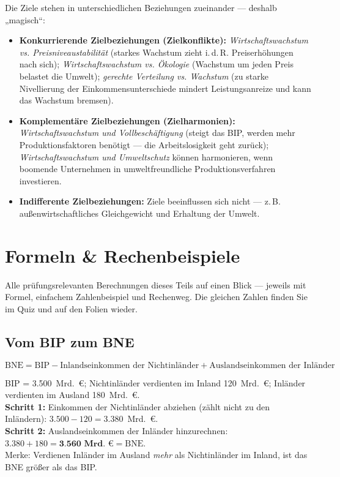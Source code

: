 \documentclass[11pt, a4paper]{article}
\begin{document}
Die Ziele stehen in unterschiedlichen Beziehungen zueinander --- deshalb „magisch``:

\begin{itemize}
  \item \textbf{Konkurrierende Zielbeziehungen (Zielkonflikte):}
    \emph{Wirtschaftswachstum vs. Preisniveaustabilität} (starkes Wachstum zieht i.\,d.\,R.
    Preiserhöhungen nach sich); \emph{Wirtschaftswachstum vs. Ökologie} (Wachstum um jeden
    Preis belastet die Umwelt); \emph{gerechte Verteilung vs. Wachstum} (zu starke
    Nivellierung der Einkommensunterschiede mindert Leistungsanreize und kann das
    Wachstum bremsen).
  \item \textbf{Komplementäre Zielbeziehungen (Zielharmonien):}
    \emph{Wirtschaftswachstum und Vollbeschäftigung} (steigt das BIP, werden mehr
    Produktionsfaktoren benötigt --- die Arbeitslosigkeit geht zurück);
    \emph{Wirtschaftswachstum und Umweltschutz} können harmonieren, wenn boomende
    Unternehmen in umweltfreundliche Produktionsverfahren investieren.
  \item \textbf{Indifferente Zielbeziehungen:} Ziele beeinflussen sich nicht ---
    z.\,B. außenwirtschaftliches Gleichgewicht und Erhaltung der Umwelt.
\end{itemize}

\section{Formeln \& Rechenbeispiele}

Alle prüfungsrelevanten Berechnungen dieses Teils auf einen Blick --- jeweils mit
Formel, einfachem Zahlenbeispiel und Rechenweg. Die gleichen Zahlen finden Sie im Quiz
und auf den Folien wieder.

\subsection{Vom BIP zum BNE}

\begin{merksatz}[title={\bfseries Formel: BIP $\rightarrow$ BNE}]
\[
\text{BNE} = \text{BIP} - \text{Inlandseinkommen der Nichtinländer}
+ \text{Auslandseinkommen der Inländer}
\]
\end{merksatz}

\begin{beispiel}
BIP = 3.500~Mrd.~€; Nichtinländer verdienten im Inland 120~Mrd.~€; Inländer verdienten
im Ausland 180~Mrd.~€.\\[0.3em]
\textbf{Schritt 1:} Einkommen der Nichtinländer abziehen (zählt nicht zu den Inländern):
$3.500 - 120 = 3.380$~Mrd.~€.\\
\textbf{Schritt 2:} Auslandseinkommen der Inländer hinzurechnen:
$3.380 + 180 = \textbf{3.560~Mrd.~€} = \text{BNE}$.\\[0.3em]
Merke: Verdienen Inländer im Ausland \emph{mehr} als Nichtinländer im Inland, ist das
BNE größer als das BIP.
\end{beispiel}
\end{document}
